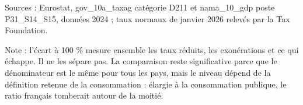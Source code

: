 Sources : Eurostat, gov\_10a\_taxag catégorie D211 et nama\_10\_gdp poste P31\_S14\_S15, données 2024 ; taux normaux de janvier 2026 relevés par la Tax Foundation.\par Note : l'écart à 100 \% mesure ensemble les taux réduits, les exonérations et ce qui échappe. Il ne les sépare pas. La comparaison reste significative parce que le dénominateur est le même pour tous les pays, mais le niveau dépend de la définition retenue de la consommation : élargie à la consommation publique, le ratio français tomberait autour de la moitié.
